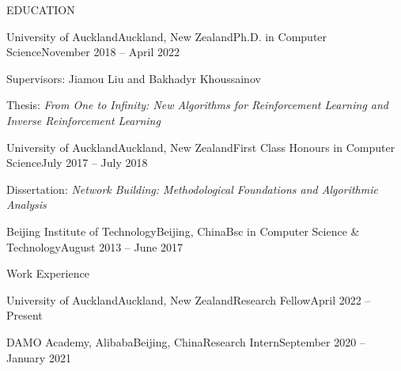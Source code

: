 \documentclass{resume} %
\begin{document}

\begin{rSection}{EDUCATION}

\begin{rSubsection}{University of Auckland}{Auckland, New Zealand}{Ph.D. in Computer Science}{November 2018 -- April 2022}%
\item Supervisors: Jiamou Liu and Bakhadyr Khoussainov
\item Thesis: {\em From One to Infinity: New Algorithms for Reinforcement Learning and Inverse Reinforcement Learning}
\end{rSubsection}

\begin{rSubsection}{University of Auckland}{Auckland, New Zealand}{First Class Honours in Computer Science}{July 2017 -- July 2018}
\item Dissertation: {\em Network Building: Methodological Foundations and Algorithmic Analysis}
\end{rSubsection}

\begin{rSubsection}{Beijing Institute of Technology}{Beijing, China}{Bsc in Computer Science \& Technology}{August 2013 -- June 2017}
\end{rSubsection}
\end{rSection}


\begin{rSection}{Work Experience}
\begin{rSubsection}{University of Auckland}{Auckland, New Zealand}{Research Fellow}{April 2022 -- Present}
\end{rSubsection}
	\begin{rSubsection}{DAMO Academy, Alibaba}{Beijing, China}{Research Intern}{September 2020 -- January 2021}
\end{rSubsection}
\end{rSection}
\end{document}
